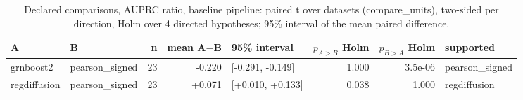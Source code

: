 \begin{table}[H]\centering\small
\caption{Declared comparisons, AUPRC ratio, baseline pipeline: paired t over datasets (compare\_units), two-sided per direction, Holm over 4 directed hypotheses; 95\% interval of the mean paired difference.}
\begin{tabular}{llrrlrrl}\toprule
A & B & n & mean A$-$B & 95\% interval & $p_{A>B}$ Holm & $p_{B>A}$ Holm & supported \\ \midrule
grnboost2 & pearson\_signed & 23 & -0.220 & [-0.291, -0.149] & 1.000 & 3.5e-06 & pearson\_signed \\
regdiffusion & pearson\_signed & 23 & +0.071 & [+0.010, +0.133] & 0.038 & 1.000 & regdiffusion \\
\bottomrule\end{tabular}\end{table}
